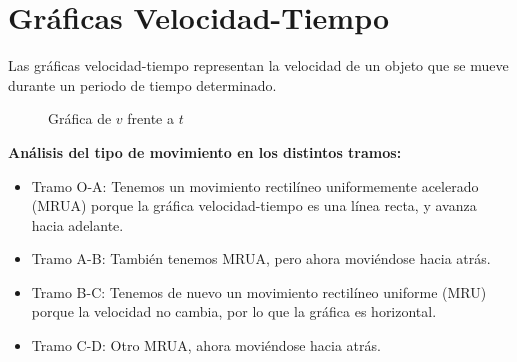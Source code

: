 \section{Gráficas Velocidad-Tiempo}
Las gráficas velocidad-tiempo representan la velocidad de un objeto que se mueve durante un periodo de tiempo determinado.
\begin{figure}[H]
    \centering
    \caption{Gráfica de \( v \) frente a \( t \)}
\end{figure}

\textbf{Análisis del tipo de movimiento en los distintos tramos:}

\begin{itemize}
    \item Tramo O-A: Tenemos un movimiento rectilíneo uniformemente acelerado (MRUA) porque la gráfica velocidad-tiempo es una línea recta, y avanza hacia adelante.
    \item Tramo A-B: También tenemos MRUA, pero ahora moviéndose hacia atrás.
    \item Tramo B-C: Tenemos de nuevo un movimiento rectilíneo uniforme (MRU) porque la velocidad no cambia, por lo que la gráfica es horizontal.
    \item Tramo C-D: Otro MRUA, ahora moviéndose hacia atrás.
\end{itemize}


